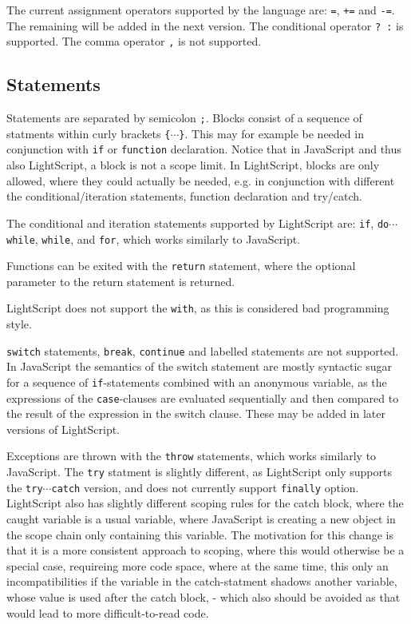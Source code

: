 \documentclass[11pt]{report}
\begin{document}
The current assignment operators supported by the language are: \verb|=|, \verb|+=| and \verb|-=|.
The remaining will be added in the next version.
The conditional operator \verb|? :| is supported. The comma operator \verb|,| is not supported.

\subsection{Statements}
Statements are separated by semicolon \verb|;|.
Blocks consist of a sequence of statments within curly brackets \verb|{|$\cdots$\verb|}|. This may for example be needed in conjunction with \verb|if| or \verb|function| declaration. Notice that in JavaScript and thus also LightScript, a block is not a scope limit. In LightScript, blocks are only allowed, where they could actually be needed, e.g. in conjunction with different the conditional/iteration statements, function declaration and try/catch.

The conditional and iteration statements supported by LightScript are: \verb|if|, \verb|do|$\cdots$\verb|while|, \verb|while|, and \verb|for|, which works similarly to JavaScript.

Functions can be exited with the \verb|return| statement, where the optional parameter to the return statement is returned.

LightScript does not support the \verb|with|, as this is considered bad programming style.

\verb|switch| statements, \verb|break|, \verb|continue| and labelled statements are not supported. In JavaScript the semantics of the switch statement are mostly syntactic sugar for a sequence of \verb|if|-statements combined with an anonymous variable, as the expressions of the \verb|case|-clauses are evaluated sequentially and then compared to the result of the expression in the switch clause.
These may be added in later versions of LightScript.

Exceptions are thrown with the \verb|throw| statements, which works similarly to JavaScript.
The \verb|try| statment is slightly different, as LightScript only supports the \verb|try|$\cdots$\verb|catch| version, and does not currently support \verb|finally| option.
LightScript also has slightly different scoping rules for the catch block, where the caught variable is a usual variable, where JavaScript is creating a new object in the scope chain only containing this variable. The motivation for this change is that it is a more consistent approach to scoping, where this would otherwise be a special case, requireing more code space, where at the same time, this only an incompatibilities if the variable in the catch-statment shadows another variable, whose value is used after the catch block, - which also should be avoided as that would lead to more difficult-to-read code.
\end{document}
